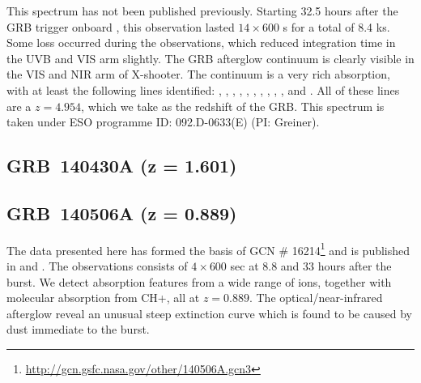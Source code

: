 \documentclass{aa}    %
\begin{document}
This spectrum has not been published previously. Starting 32.5 hours after the
GRB trigger onboard \swift, this observation lasted $14\times600$ s for a total
of 8.4 ks. Some loss occurred during the observations, which reduced integration
time in the UVB and VIS arm slightly. The GRB afterglow continuum is clearly
visible in the VIS and NIR arm of X-shooter. The continuum is a very rich
absorption, with at least the following lines identified: \lyg, \lyb, \lya,
\SIii, \SIiv, \civ, \alii, \aliii, \feii, \mgii, and \mgi. All of these lines
are a $z = 4.954$, which we take as the redshift of the GRB. This spectrum is
taken under ESO programme ID: 092.D-0633(E) (PI: Greiner).

\subsection{GRB~140430A (z = 1.601)}	






\subsection{GRB~140506A  (z = 0.889)}	
The data presented here has formed the basis of GCN \#
16214\footnote{\url{http://gcn.gsfc.nasa.gov/other/140506A.gcn3}} and is
published in \citet{Fynbo2014} and \citet{Heintz2017a}. The observations
consists of $4\times 600$ sec at 8.8 and 33 hours after the burst. We detect
absorption features from a wide range of ions, together with molecular
absorption from CH+, all at $z=0.889$. The optical/near-infrared afterglow
reveal an unusual steep extinction curve which is found to be caused by dust
immediate to the burst.
\end{document}
